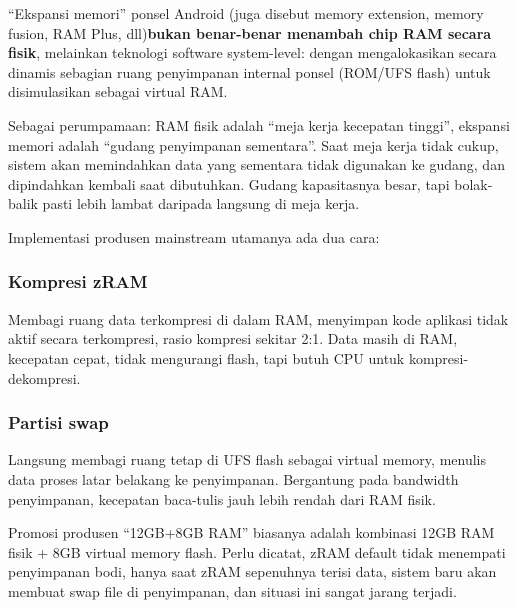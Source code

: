 


“Ekspansi memori” ponsel Android (juga disebut memory extension, memory fusion, RAM Plus, dll)\textbf{bukan benar-benar menambah chip RAM secara fisik}, melainkan teknologi software system-level: dengan mengalokasikan secara dinamis sebagian ruang penyimpanan internal ponsel (ROM/UFS flash) untuk disimulasikan sebagai virtual RAM.

Sebagai perumpamaan: RAM fisik adalah “meja kerja kecepatan tinggi”, ekspansi memori adalah “gudang penyimpanan sementara”. Saat meja kerja tidak cukup, sistem akan memindahkan data yang sementara tidak digunakan ke gudang, dan dipindahkan kembali saat dibutuhkan. Gudang kapasitasnya besar, tapi bolak-balik pasti lebih lambat daripada langsung di meja kerja.


Implementasi produsen mainstream utamanya ada dua cara:

\subsubsection*{Kompresi zRAM}

Membagi ruang data terkompresi di dalam RAM, menyimpan kode aplikasi tidak aktif secara terkompresi, rasio kompresi sekitar 2:1. Data masih di RAM, kecepatan cepat, tidak mengurangi flash, tapi butuh CPU untuk kompresi-dekompresi.

\subsubsection*{Partisi swap}

Langsung membagi ruang tetap di UFS flash sebagai virtual memory, menulis data proses latar belakang ke penyimpanan. Bergantung pada bandwidth penyimpanan, kecepatan baca-tulis jauh lebih rendah dari RAM fisik.

Promosi produsen “12GB+8GB RAM” biasanya adalah kombinasi 12GB RAM fisik + 8GB virtual memory flash. Perlu dicatat, zRAM default tidak menempati penyimpanan bodi, hanya saat zRAM sepenuhnya terisi data, sistem baru akan membuat swap file di penyimpanan, dan situasi ini sangat jarang terjadi.


